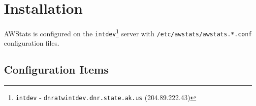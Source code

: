 
\newpage
\section{Installation}
AWStats is configured on the \texttt{intdev}\footnote{\texttt{intdev} - 
\texttt{dnratwintdev.dnr.state.ak.us} (204.89.222.43)} server
with \texttt{/etc/awstats/awstats.*.conf} configuration files.


\subsection{Configuration Items}


\begin{center}
\begin{table}[htbp]
\end{table}
\end{center}





